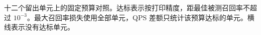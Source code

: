 \begin{table}[tbp]
\centering
\caption[固定预算的质量与吞吐量对照]{十二个留出单元上的固定预算对照。达标表示按打印精度，距最佳被测召回率不超过 $10^{-3}$。最大召回率损失使用全部单元，QPS 差额只统计该预算达标的单元。横线表示没有达标单元。}
\label{tab:7-fixed-budget}
\small

\end{table}
